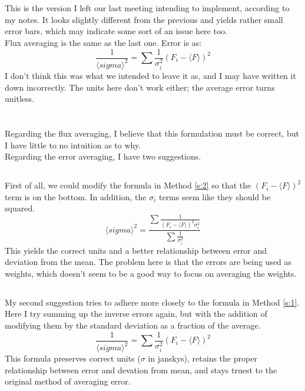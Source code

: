 \documentclass{article}
\newcommand{\av}[1]{\langle #1 \rangle}
\begin{document}
\section{} \label{s:3}
This is the version I left our last meeting intending to implement, according to my notes.
It looks slightly different from the previous and yields rather small error bars, which
may indicate some sort of an issue here too. \\
Flux averaging is the same as the last one.
Error is as:
$$ \frac{1}{\av{sigma}^{2}} = \sum \frac{1}{\sigma_{i}^{2}} (F_{i} - \av{F})^{2} $$
I don't think this was what we intended to leave it as,
and I may have written it down incorrectly.
The units here don't work either; the average error turns unitless.

\section{} \label{s:4}
Regarding the flux averaging, I believe that this formulation must be correct,
but I have little to no intuition as to why. \\
Regarding the error averaging, I have two suggestions.
\subsection{} \label{s:41}
First of all, we could modify the formula in Method \ref{s:2} so that the $(F_{i} - \av{F})^{2}$
term is on the bottom.
In addition, the $\sigma_{i}$ terms seem like they should be squared.
$$ \av{sigma}^{2} =  \frac{\sum \frac{1}{(F_{i} - \av{F})^{2} \sigma_{i}^{2}}}{\sum \frac{1}{\sigma_{i}^{2}}} $$
This yields the correct units and a better relationship between error and deviation from the mean.
The problem here is that the errors are being used as weights, which doesn't seem to be a good way
to focus on averaging the weights.
\subsection{} \label{s:42}
My second suggestion tries to adhere more closely to the formula in Method \ref{s:1}.
Here I try summing up the inverse errors again, but with the addition of modifying them by the
standard deviation as a fraction of the average.
$$ \frac{1}{\av{sigma}^{2}} = \sum \frac{1}{\sigma_{i}^{2}} (F_{i} - \av{F})^{2} $$
This formula preserves correct units ($\sigma$ in janskys),
retains the proper relationship between error and devation from mean,
and stays truest to the original method of averaging error. \\
\end{document}
